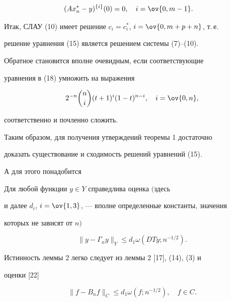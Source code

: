 \begin{pf}
\begin{align}
& (A x^*_n-y)^{\{i\}}(0)=0,\quad i=\ov{0,m-1}.\notag 


\end{align} 


 


Итак, СЛАУ (10) имеет решение $c_i=c^*_i$, $i=\ov{0,m+p+n}$, т.\,е. 


решение уравнения (15) является решением системы (7)--(10). 


 


Обратное становится вполне очевидным, если соответствующие 


уравнения в (18) умножить на выражения 


$$ 


2^{-n}\binom{n}{i}(t+1)^i(1-t)^{n-i},\quad i=\ov{0,n},


$$ 


соответственно и почленно сложить. 


 


Таким образом, для получения утверждений теоремы 1 достаточно 


доказать существование и сходимость решений уравнений (15). 


А для этого понадобится 


 


\begin{lem} 


Для любой функции $y\in Y$ справедлива оценка $($здесь 


и далее $d_i$, $i=\ov{1,3}$, --- вполне определенные константы, значения 


которых не зависят от $n)$ 


$$ 


\|y-\Gamma_n y\|_Y\le d_1\omega(D T y;n^{-1/2}). 


$$ 


\end{lem} 


 


Истинность леммы 2 легко следует из леммы 2 [17], (14), (3) и 


оценки [22] 


\begin{equation} 


\|f-B_n f\|_C\le d_1\omega(f;n^{-1/2}),\quad f\in C. 


\end{equation} 



\end{pf}
